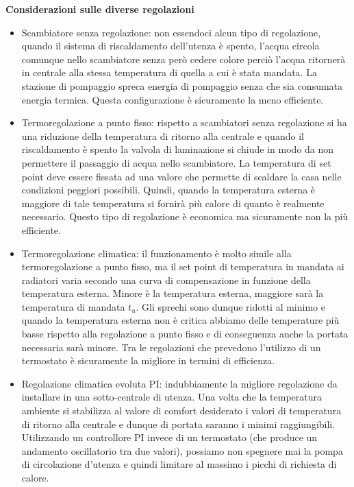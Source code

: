 \documentclass[laurea,oneside,11pt]{USiena_tesiLM}
\begin{document}
\textbf{Considerazioni sulle diverse regolazioni}
\begin{itemize}
\item Scambiatore senza regolazione: non essendoci alcun tipo di regolazione, quando il sistema di riscaldamento dell'utenza è spento, l'acqua circola comunque nello scambiatore senza però cedere colore perciò l'acqua ritornerà in centrale alla stessa temperatura di quella a cui è stata mandata. La stazione di pompaggio spreca energia di pompaggio senza che sia consumata energia termica. Questa configurazione è sicuramente la meno efficiente.
\item Termoregolazione a punto fisso: rispetto a scambiatori senza regolazione si ha una riduzione della temperatura di ritorno alla  centrale e quando il riscaldamento è spento la valvola di laminazione si chiude in modo da non permettere il passaggio di acqua nello scambiatore. La temperatura di set point deve essere fissata ad una valore che permette di scaldare la casa nelle condizioni peggiori possibili. Quindi, quando la temperatura esterna è maggiore di tale temperatura si fornirà più calore di quanto è realmente necessario. Questo tipo di regolazione è economica ma sicuramente non la più efficiente.
\item Termoregolazione climatica: il funzionamento è molto simile alla termoregolazione a punto fisso, ma il set point di temperatura in mandata ai radiatori varia secondo una curva di compensazione in funzione della temperatura esterna. Minore è la temperatura esterna, maggiore sarà la temperatura di mandata $t_u$. Gli sprechi sono dunque ridotti al minimo e quando la temperatura esterna non è critica abbiamo delle temperature più basse rispetto alla regolazione a punto fisso e di conseguenza anche la portata necessaria sarà minore. Tra le regolazioni che prevedono l'utilizzo di un termostato è sicuramente la migliore in termini di efficienza.
\item Regolazione climatica evoluta PI: indubbiamente la migliore regolazione da installare in una sotto-centrale di utenza. Una volta che la temperatura ambiente si stabilizza al valore di comfort desiderato i valori di temperatura di ritorno alla centrale e dunque di portata saranno i minimi raggiungibili. Utilizzando un controllore PI invece di un termostato (che produce un andamento oscillatorio tra due valori), possiamo non spegnere mai la pompa di circolazione d'utenza e quindi limitare al massimo i picchi di richiesta di calore.
\end{itemize}
\end{document}
